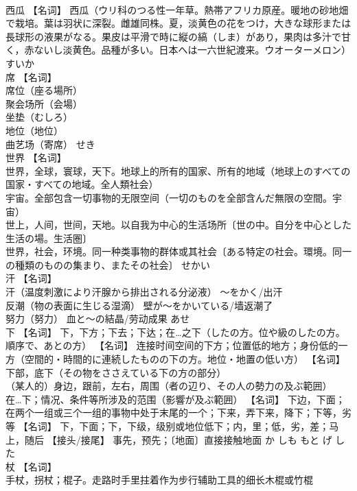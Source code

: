 \documentclass[8pt]{extreport}
\begin{document}
\begin{CJK}{UTF8}{min}
\\	西瓜	【名词】 西瓜（ウリ科のつる性一年草。熱帯アフリカ原産。暖地の砂地畑で栽培。葉は羽状に深裂。雌雄同株。夏，淡黄色の花をつけ，大きな球形または長球形の液果がなる。果皮は平滑で時に縦の縞（しま）があり，果肉は多汁で甘く，赤ないし淡黄色。品種が多い。日本へは一六世紀渡来。ウオーターメロン）	すいか	
\\	席	【名词】 
\\	席位（座る場所） 
\\	聚会场所（会場） 
\\	坐垫（むしろ） 
\\	地位（地位） 
\\	曲艺场（寄席）	せき	
\\	世界	【名词】 
\\	世界，全球，寰球，天下。地球上的所有的国家、所有的地域（地球上のすべての国家・すべての地域。全人類社会） 
\\	宇宙。全部包含一切事物的无限空间（一切のものを全部含んだ無限の空間。宇宙） 
\\	世上，人间，世间，天地。以自我为中心的生活场所〔世の中。自分を中心とした生活の場。生活圏〕 
\\	世界，社会，环境。同一种类事物的群体或其社会〔ある特定の社会。環境。同一の種類のものの集まり、またその社会〕	せかい	
\\	汗	【名词】 
\\	汗（温度刺激により汗腺から排出される分泌液） ～をかく/出汗 
\\	反潮（物の表面に生じる湿滴） 壁が～をかいている/墙返潮了 
\\	努力（努力） 血と～の結晶/劳动成果	あせ	
\\	下	【名词】 下，下方；下去；下达；在…之下（したの方。位や級のしたの方。順序で、あとの方） 【名词】 连接时间空间的下方；位置低的地方；身份低的一方（空間的・時間的に連続したものの下の方。地位・地置の低い方） 【名词】 
\\	下部，底下（その物をささえている下の方の部分） 
\\	（某人的）身边，跟前，左右，周围（者の辺り、その人の勢力の及ぶ範囲） 
\\	在…下；情况、条件等所涉及的范围（影響が及ぶ範囲） 【名词】 下边，下面；在两个一组或三个一组的事物中处于末尾的一个；下来，弄下来，降下；下等，劣等 【名词】 下，下面；下，下级，级别或地位低下；内，里；低，劣，差；马上，随后 【接头/接尾】 事先，预先；〔地面〕直接接触地面	か しも もと げ した	
\\	杖	【名词】 
\\	手杖，拐杖；棍子。走路时手里拄着作为步行辅助工具的细长木棍或竹棍 

\end{CJK}
\end{document}
